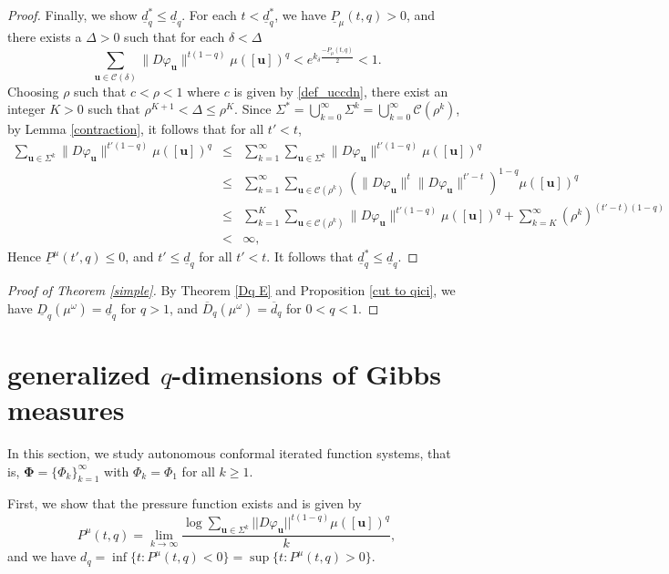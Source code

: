 \documentclass[12pt]{amsart}
\theoremstyle{plain}
\theoremstyle{definition}
\theoremstyle{remark}
\newcommand{\bu}{\mathbf{u}}
\begin{document}
\begin{proof}
Finally, we show $\underline{d}_q^*\leq \underline{d}_q$. For each $t<\underline{d}_q^*$,  we have $\underline P_\mu(t, q)> 0$, and  there exists a $\Delta>0$ such that for each $\delta<\Delta$
$$
\sum_{\mathbf{u}\in\mathcal{C}(\delta)}\|D\varphi_\mathbf{u}\|^{t(1-q)}\mu([\bu])^q<e^{k_\delta\frac{-\underline P_\mu(t, q)}{2}}<1.
$$
Choosing $\rho$ such that $c<\rho<1$ where $c$ is given by \eqref{def_uccdn}, there exist  an integer $K>0$ such that  $\rho^{K+1}<\Delta\le\rho^{K}$. Since  $\Sigma^*=\bigcup_{k=0}^\infty\Sigma^k=\bigcup_{k=0}^\infty\mathcal{C}(\rho^k)$,  by Lemma \ref{contraction}, it follows that for all $t'<t$, 
\begin{eqnarray*}
\sum_{\mathbf{u}\in\Sigma^k}\|D\varphi_\mathbf{u}\|^{t'(1-q)}\mu([\bu])^q&\le&\sum_{k=1}^\infty\sum_{\mathbf{u}\in\Sigma^k}\|D\varphi_\mathbf{u}\|^{t'(1-q)}\mu([\bu])^q  \\
&\le&\sum_{k=1}^\infty \sum_{\mathbf{u}\in\mathcal{C}(\rho^k)}(\|D\varphi_\mathbf{u}\|^{t} \|D\varphi_\mathbf{u}\|^{t'-t})^{1-q}\mu([\bu])^q  \\
&\le&\sum_{k=1}^{K} \sum_{\mathbf{u}\in\mathcal{C}(\rho^k)}\|D\varphi_\mathbf{u}\|^{t'(1-q)}\mu([\bu])^q +\sum_{k=K}^\infty (\rho^k)^{(t'-t)(1-q)}  \\
&<&\infty,
\end{eqnarray*}
Hence $\underline P^\mu(t', q)\leq  0$, and  $t'\le  \underline{d}_q$ for all $t'<t$. It follows that $\underline{d}_q^*\le \underline{d}_q$. 
\end{proof}






\begin{proof}[Proof of Theorem \ref{simple}]
By Theorem \ref{Dq E} and Proposition \ref{cut to qici}, we have $\underline{D}_q(\mu^\omega)=\underline{d}_q$ for $q>1$, and $
\overline{D}_q(\mu^\omega)=\overline{d}_q$ for $0<q<1$.
\end{proof}







\section{generalized $q$-dimensions of Gibbs measures}
In this section, we study  autonomous conformal iterated function systems, that is,  $\boldsymbol{\Phi}=\{\Phi_k\}_{k=1}^\infty$ with  $\Phi_k=\Phi_1$ for all $k\geq 1$. 

First, we show that the pressure function exists and is given by 
$$
P^\mu(t, q)= \lim_{k\to\infty}\frac{\log  \sum_{\mathbf{u}\in\Sigma^k}||D\varphi_\mathbf{u}||^{t(1-q)}\mu([\bu])^q}{k},
$$
and we have $ d_q=\inf\{t:  P^\mu(t, q)<0\}=\sup\{t: P^\mu(t, q)>0\}.$
\end{document}
